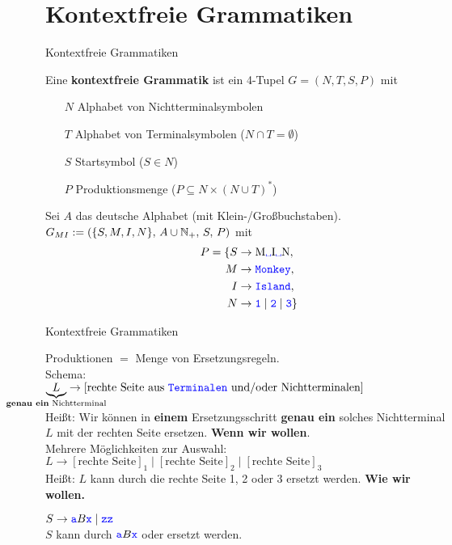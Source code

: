 \section{Kontextfreie Grammatiken}
\begin{frame}{Kontextfreie Grammatiken}
	
	\begin{Definition}
		Eine \textbf{kontextfreie Grammatik} ist ein 4-Tupel $G = (N, T, S ,P)$ mit
		\begin{itemize}
			\item[$N$] Alphabet von Nichtterminalsymbolen
			\item[$T$] Alphabet von Terminalsymbolen ($N \cap T = \emptyset$)
			\item[$S$] Startsymbol ($S \in N$)
			\item[$P$] Produktionsmenge ($P \subseteq N \times (N \cup T)^\ast$)
		\end{itemize}
	\end{Definition}

	\pause
	\begin{Beispiel}
		Sei $A$ das deutsche Alphabet (mit Klein-/Großbuchstaben).\\
		$G_{MI} := \left(\{S, M, I, N\}, \, A \cup \mathbb{N}_+, \, S, \, P\right)$ mit
		\begin{align*}
			P = \{S &\to \text{M\word\sp I\word\sp N}, \\
			M &\to \word{Monkey}, \\
			I &\to \word{Island}, \\
			N &\to \word 1 \mid \word 2 \mid \word 3 \}
		\end{align*}
	\end{Beispiel}
\end{frame}

\begin{frame}{Kontextfreie Grammatiken}
	\begin{block}{Produktionen}
		$=$ Menge von Ersetzungsregeln. \\
		Schema: \\
		\qqquad $\underbrace{L}_{\mathclap{\text{\textbf{genau ein} Nichtterminal}}} \to [\text{rechte Seite aus \word{Terminalen} und/oder Nichtterminalen}]$ \\
		\smallskip
		Heißt: Wir können in \textbf{einem} Ersetzungsschritt \textbf{genau ein} solches Nichtterminal $L$ mit der rechten Seite ersetzen. \textbf{Wenn wir wollen}. \\
		\medskip
		\pause
		Mehrere Möglichkeiten zur Auswahl: \\
		\qquad $L \to [\text{rechte Seite}]_1 \mid [\text{rechte Seite}]_2 \mid [\text{rechte Seite}]_3$ \\
		Heißt: $L$ kann durch die rechte Seite 1, 2 oder 3 ersetzt werden. \textbf{Wie wir wollen.} \\
		\pause
		\begin{Beispiel}
			$S \to \hbox{\textcolor{blue}{\texttt{a}}}B\hbox{\textcolor{blue}{\texttt{x}}} \mid \hbox{\textcolor{blue}{\texttt{zz}}}$ \\
			\impl $S$ kann durch $\hbox{\textcolor{blue}{\texttt{a}}}B\hbox{\textcolor{blue}{\texttt{x}}}$ oder  ersetzt werden.
		\end{Beispiel}
	\end{block}
\end{frame}

